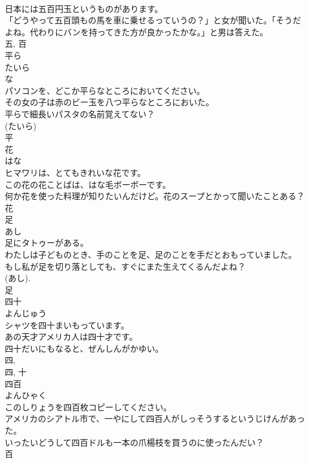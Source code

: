 \documentclass[8pt]{extreport}
\begin{document}
\begin{CJK}{UTF8}{min}
\\	日本には五百円玉というものがあります。	
\\	「どうやって五百頭もの馬を車に乗せるっていうの？」と女が聞いた。「そうだよね。代わりにバンを持ってきた方が良かったかな。」と男は答えた。	
\\	五, 百	
\\	平ら	
\\	たいら	
\\	な 
\\	パソコンを、どこか平らなところにおいてください。	
\\	その女の子は赤のビー玉を八つ平らなところにおいた。	
\\	平らで細長いパスタの名前覚えてない？	
\\	(たいら) 
\\	平	
\\	花	
\\	はな	
\\	ヒマワリは、とてもきれいな花です。	
\\	この花の花ことばは、はな毛ボーボーです。	
\\	何か花を使った料理が知りたいんだけど。花のスープとかって聞いたことある？	
\\	花	
\\	足	
\\	あし	
\\	足にタトゥーがある。	
\\	わたしは子どものとき、手のことを足、足のことを手だとおもっていました。	
\\	もし私が足を切り落としても、すぐにまた生えてくるんだよね？	
\\	(あし). 
\\	足	
\\	四十	
\\	よんじゅう	
\\	シャツを四十まいもっています。	
\\	あの天才アメリカ人は四十才です。	
\\	四十だいにもなると、ぜんしんがかゆい。	
\\	四, 
\\	四, 十	
\\	四百	
\\	よんひゃく	
\\	このしりょうを四百枚コピーしてください。	
\\	アメリカのシアトル市で、一やにして四百人がしっそうするというじけんがあった。	
\\	いったいどうして四百ドルも一本の爪楊枝を買うのに使ったんだい？	
\\	百 

\end{CJK}
\end{document}
